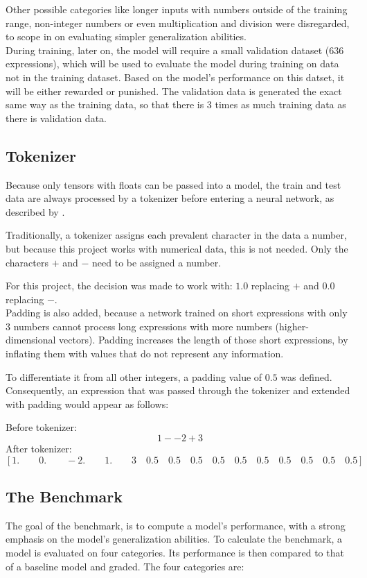 \documentclass{article}
\begin{document}
Other possible categories like longer inputs with numbers outside of the training range, non-integer numbers or even multiplication and division were disregarded, to scope in on evaluating simpler generalization abilities.
\\[2em]
During training, later on, the model will require a small validation dataset (636 expressions), which will be used to evaluate the model during training on data not in the training dataset. Based on the model's performance on this datset, it will be either rewarded or punished.
The validation data is generated the exact same way as the training data, so that there is 3 times as much training data as there is validation data.

\subsection{Tokenizer}

Because only tensors with floats can be passed into a model, the train and test data are always processed by a tokenizer before entering a neural network, as described by \cite{geeksforgeeks_nlp_tokenizing}.

Traditionally, a tokenizer assigns each prevalent character in the data a number, but because this project works with numerical data, this is not needed. Only the characters $+$ and $-$ need to be assigned a number.

For this project, the decision was made to work with: $1.0$ replacing $+$ and $0.0$ replacing $-$.
\\[1em]
Padding is also added, because a network trained on short expressions with only 3 numbers cannot process long expressions with more numbers (higher-dimensional vectors). Padding increases the length of those short expressions, by inflating them with values that do not represent any information.

To differentiate it from all other integers, a padding value of $0.5$ was defined.
\\[1em]
Consequently, an expression that was passed through the tokenizer and extended with padding would appear as follows:

Before tokenizer:
$$
1 - -2 + 3
$$
After tokenizer:
$$
[1.\qquad 0.\qquad -2.\qquad 1.\qquad 3\quad 0.5\quad 0.5\quad 0.5\quad 0.5\quad 0.5\quad 0.5\quad 0.5\quad 0.5\quad 0.5\quad 0.5]
$$

\subsection{The Benchmark}
The goal of the benchmark, is to compute a model's performance, with a strong emphasis on the model's generalization abilities.
To calculate the benchmark, a model is evaluated on four categories. Its performance is then compared to that of a baseline model and graded. The four categories are: 
\end{document}
